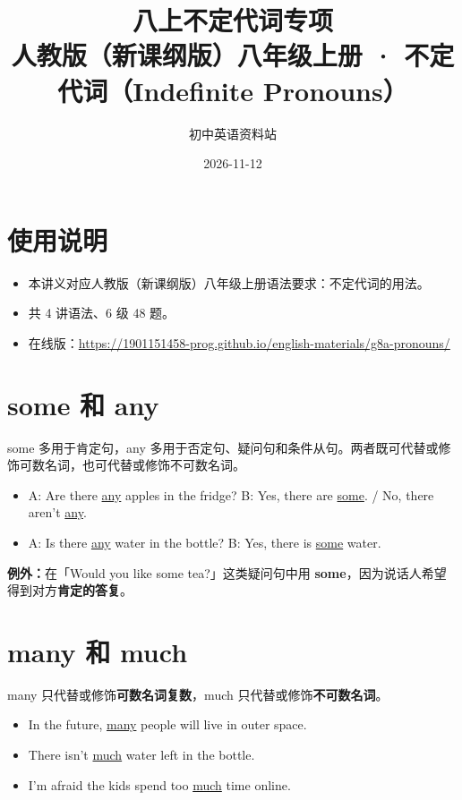 \documentclass[11pt,a4paper]{ctexart}
\title{\textbf{八上不定代词专项}\\[4pt]
\large 人教版（新课纲版）八年级上册 · 不定代词（Indefinite Pronouns）}
\author{初中英语资料站}
\date{2026-11-12}
\begin{document}
\maketitle

\section*{使用说明}
\begin{itemize}[leftmargin=1.4em]
\item 本讲义对应人教版（新课纲版）八年级上册语法要求：不定代词的用法。
\item 共 4 讲语法、6 级 48 题。
\item 在线版：\url{https://1901151458-prog.github.io/english-materials/g8a-pronouns/}
\end{itemize}

\section{some 和 any}
some 多用于肯定句，any 多用于否定句、疑问句和条件从句。两者既可代替或修饰可数名词，也可代替或修饰不可数名词。
\begin{itemize}[leftmargin=1.4em]
\item A: Are there \underline{any} apples in the fridge? B: Yes, there are \underline{some}. / No, there aren't \underline{any}.
\item A: Is there \underline{any} water in the bottle? B: Yes, there is \underline{some} water.
\end{itemize}
\textbf{例外：}在「Would you like some tea?」这类疑问句中用 \textbf{some}，因为说话人希望得到对方\textbf{肯定的答复}。

\section{many 和 much}
many 只代替或修饰\textbf{可数名词复数}，much 只代替或修饰\textbf{不可数名词}。
\begin{itemize}[leftmargin=1.4em]
\item In the future, \underline{many} people will live in outer space.
\item There isn't \underline{much} water left in the bottle.
\item I'm afraid the kids spend too \underline{much} time online.
\end{itemize}
\end{document}
